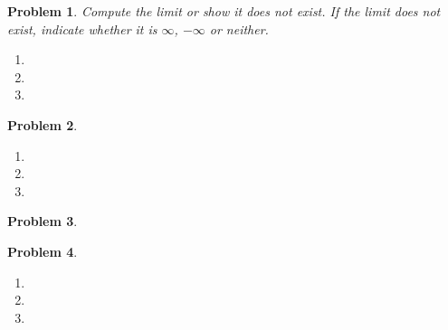 \documentclass{article}
\renewcommand{\fcProblemRef}{\theproblem.\theenumi}
\newtheorem{problem}{Problem}
\begin{document}


\begin{problem}Compute the limit or show it does not exist. If the limit does not exist, indicate whether it is $\infty$, $-\infty$ or neither.
\begin{enumerate}[ref={\fcProblemRef}]
\item 
\item 
\item 
\end{enumerate}
\end{problem}





\begin{problem}
\begin{enumerate}[ref={\fcProblemRef}]
\item 
\item 
\item 

\end{enumerate}
\end{problem}




\begin{problem}

\end{problem}


\begin{problem}~
\begin{enumerate}[ref={\fcProblemRef}]
\item 

\item 

\item 

\end{enumerate}
\end{problem}
\end{document}
